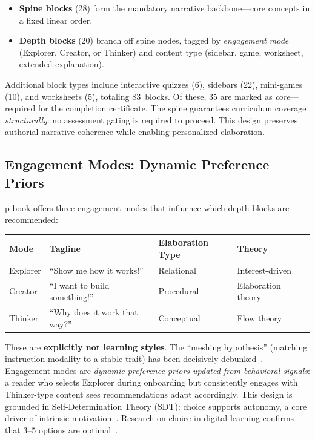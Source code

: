 \documentclass[11pt,a4paper]{article}
\begin{document}
\begin{itemize}
  \item \textbf{Spine blocks} (28) form the mandatory narrative backbone---core concepts in a fixed linear order.
  \item \textbf{Depth blocks} (20) branch off spine nodes, tagged by \emph{engagement mode} (Explorer, Creator, or Thinker) and content type (sidebar, game, worksheet, extended explanation).
\end{itemize}

Additional block types include interactive quizzes (6), sidebars (22), mini-games (10), and worksheets (5), totaling 83~blocks. Of these, 35 are marked as \emph{core}---required for the completion certificate. The spine guarantees curriculum coverage \emph{structurally}: no assessment gating is required to proceed. This design preserves authorial narrative coherence while enabling personalized elaboration.

\subsection{Engagement Modes: Dynamic Preference Priors}

p-book offers three engagement modes that influence which depth blocks are recommended:

\begin{center}
\small
\begin{tabular}{@{}llll@{}}
\toprule
Mode & Tagline & Elaboration Type & Theory \\
\midrule
Explorer & ``Show me how it works!'' & Relational & Interest-driven~\cite{schraw2001} \\
Creator & ``I want to build something!'' & Procedural & Elaboration theory~\cite{reigeluth1999} \\
Thinker & ``Why does it work that way?'' & Conceptual & Flow theory~\cite{csikszentmihalyi1990} \\
\bottomrule
\end{tabular}
\end{center}

These are \textbf{explicitly not learning styles}. The ``meshing hypothesis'' (matching instruction modality to a stable trait) has been decisively debunked~\cite{pashler2008,touloumakos2023}. Engagement modes are \emph{dynamic preference priors updated from behavioral signals}: a reader who selects Explorer during onboarding but consistently engages with Thinker-type content sees recommendations adapt accordingly. This design is grounded in Self-Determination Theory (SDT): choice supports autonomy, a core driver of intrinsic motivation~\cite{ryan2000}. Research on choice in digital learning confirms that 3--5 options are optimal~\cite{evans2015,schneider2018}.
\end{document}
